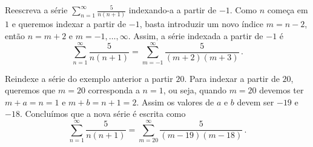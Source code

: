 \begin{example}
  Reescreva a série
  \(
    \sum_{n=1}^\infty\frac{5}{n(n+1)}
  \)
  indexando-a a partir de $-1$.
  \solution
  Como $n$ começa em $1$ e queremos indexar a partir de $-1$,
  basta introduzir um novo índice $m=n-2$, então $n=m+2$ e
  $m=-1, \dots, \infty$.
  Assim, a série indexada a partir de $-1$ é
  \[
    \sum_{n=1}^\infty\frac{5}{n(n+1)} =
    \sum_{m=-1}^\infty\frac{5}{(m+2)(m+3)}   \,.
  \]
\end{example}

\begin{example}
  Reindexe a série do exemplo anterior a partir $20$.
  \solution
  Para indexar a partir de $20$, queremos que
  $m=20$ corresponda a $n=1$, ou seja,
  quando $m=20$ devemos ter $m+a=n=1$ e $m+b=n+1=2$.
  Assim os valores de $a$ e $b$ devem ser $-19$ e $-18$.
  Concluímos que a nova série é escrita como
  \[
    \sum_{n=1}^ \infty\frac{5}{n(n+1)} =
    \sum_{m=20}^\infty\frac{5}{(m-19)(m-18)}   \,.
  \]
\end{example}


